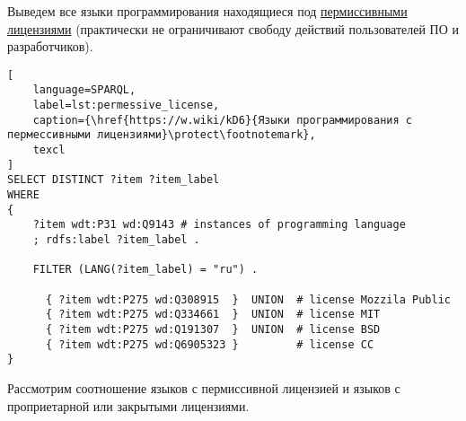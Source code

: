 Выведем все языки программирования находящиеся под \href{https://en.wikipedia.org/wiki/Permissive_software_license}{пермиссивными лицензиями} (практически не ограничивают свободу действий пользователей ПО и разработчиков).
\begin{lstlisting}[
	language=SPARQL,
	label=lst:permessive_license,
	caption={\href{https://w.wiki/kD6}{Языки программирования с пермессивными лицензиями}\protect\footnotemark},
	texcl
]
SELECT DISTINCT ?item ?item_label
WHERE
{
    ?item wdt:P31 wd:Q9143 # instances of programming language
    ; rdfs:label ?item_label . 

    FILTER (LANG(?item_label) = "ru") . 
  
      { ?item wdt:P275 wd:Q308915  }  UNION  # license Mozzila Public
      { ?item wdt:P275 wd:Q334661  }  UNION  # license MIT
      { ?item wdt:P275 wd:Q191307  }  UNION  # license BSD
      { ?item wdt:P275 wd:Q6905323 }         # license CC
}
\end{lstlisting}


Рассмотрим соотношение языков с пермиссивной лицензией и языков с проприетарной или закрытыми лицензиями.

\pagebreak

